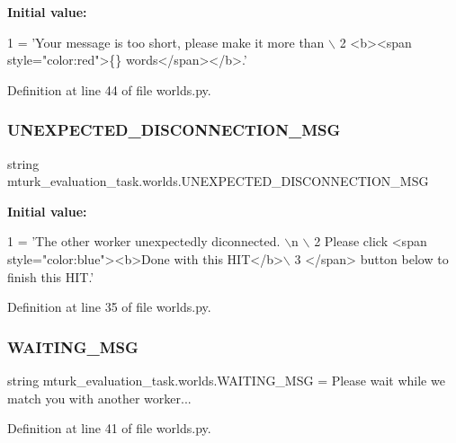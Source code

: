 {\bfseries Initial value\+:}
\begin{DoxyCode}
1 =  \textcolor{stringliteral}{'Your message is too short, please make it more than \(\backslash\)}
2 \textcolor{stringliteral}{        <b><span style="color:red">\{\} words</span></b>.'}
\end{DoxyCode}


Definition at line 44 of file worlds.\+py.

\mbox{\label{namespacemturk__evaluation__task_1_1worlds_a73f8c1ccbfa8c8831c5a76f545257a66}} 
\subsubsection{\texorpdfstring{U\+N\+E\+X\+P\+E\+C\+T\+E\+D\+\_\+\+D\+I\+S\+C\+O\+N\+N\+E\+C\+T\+I\+O\+N\+\_\+\+M\+SG}{UNEXPECTED\_DISCONNECTION\_MSG}}
{\footnotesize\ttfamily string mturk\+\_\+evaluation\+\_\+task.\+worlds.\+U\+N\+E\+X\+P\+E\+C\+T\+E\+D\+\_\+\+D\+I\+S\+C\+O\+N\+N\+E\+C\+T\+I\+O\+N\+\_\+\+M\+SG}

{\bfseries Initial value\+:}
\begin{DoxyCode}
1 =  \textcolor{stringliteral}{'The other worker unexpectedly diconnected. \(\backslash\)n \(\backslash\)}
2 \textcolor{stringliteral}{        Please click <span style="color:blue"><b>Done with this HIT</b>\(\backslash\)}
3 \textcolor{stringliteral}{        </span> button below to finish this HIT.'}
\end{DoxyCode}


Definition at line 35 of file worlds.\+py.

\mbox{\label{namespacemturk__evaluation__task_1_1worlds_a55c6bb50d79fc2fd088df8cb8a940fc7}} 
\subsubsection{\texorpdfstring{W\+A\+I\+T\+I\+N\+G\+\_\+\+M\+SG}{WAITING\_MSG}}
{\footnotesize\ttfamily string mturk\+\_\+evaluation\+\_\+task.\+worlds.\+W\+A\+I\+T\+I\+N\+G\+\_\+\+M\+SG = \textquotesingle{}Please wait while we match you with another worker...\textquotesingle{}}



Definition at line 41 of file worlds.\+py.

